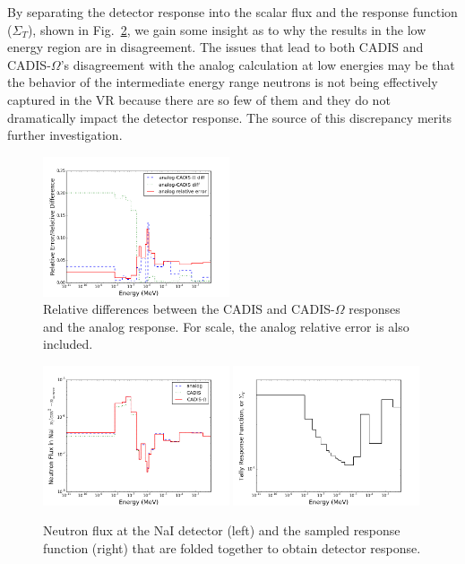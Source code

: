 \documentclass[12pt]{article}
\begin{document}
By separating the detector response into the scalar flux and the response function ($\Sigma_{T}$), shown in Fig.~\ref{fig::tallyproducts}, we gain some insight as to why the results in the low energy region are in disagreement.
The issues that lead to both CADIS and CADIS-$\Omega$'s disagreement with the analog calculation at low energies may be that the behavior of the intermediate energy range neutrons is not being effectively captured in the VR because there are so few of them and they do not dramatically impact the detector response. 
The source of this discrepancy merits further investigation. 
\begin{figure}
  \begin{center}
    \includegraphics[width=0.49\textwidth]{./images/RE_differences.png}
    \caption[]{\label{fig::rediffs} Relative differences between the CADIS and CADIS-$\Omega$ responses and the analog response. For scale, the analog relative error is also included. }
  \end{center}
\end{figure}
%
\begin{figure}
  \begin{center}
    \includegraphics[width=0.49\textwidth]{./images/flux.png}
    \includegraphics[width=0.49\textwidth]{./images/response_function.png}
    \caption[]{\label{fig::tallyproducts} Neutron flux at the NaI detector (left) and the sampled response function (right) that are folded together to obtain detector response. }
  \end{center}
\end{figure}
\end{document}
